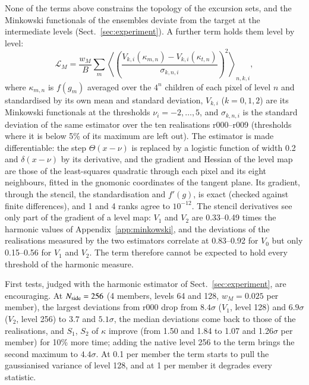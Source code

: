 \documentclass{aa}
\newcommand{\nside}{N_{\rm side}}
\begin{document}
None of the terms above constrains the topology of the excursion sets, and the Minkowski functionals of the ensembles deviate from the target at the intermediate levels (Sect.~\ref{sec:experiment}). A further term holds them level by level:
\begin{equation}
\mathcal{L}_M = \frac{w_M}{B}\sum_m \left\langle \left(\frac{V_{k,i}(\kappa_{m,n}) - V_{k,i}(\kappa_{t,n})}{\sigma_{k,n,i}}\right)^2\right\rangle_{n,k,i},
\end{equation}
where $\kappa_{m,n}$ is $f(g_m)$ averaged over the $4^{n}$ children of each pixel of level $n$ and standardised by its own mean and standard deviation, $V_{k,i}$ ($k=0,1,2$) are its Minkowski functionals at the thresholds $\nu_i=-2,\dots,5$, and $\sigma_{k,n,i}$ is the standard deviation of the same estimator over the ten realisations r000--r009 (thresholds where it is below 5\% of its maximum are left out). The estimator is made differentiable: the step $\Theta(x-\nu)$ is replaced by a logistic function of width 0.2 and $\delta(x-\nu)$ by its derivative, and the gradient and Hessian of the level map are those of the least-squares quadratic through each pixel and its eight neighbours, fitted in the gnomonic coordinates of the tangent plane. Its gradient, through the stencil, the standardisation and $f'(g)$, is exact (checked against finite differences), and 1 and 4 ranks agree to $10^{-12}$. The stencil derivatives see only part of the gradient of a level map: $V_1$ and $V_2$ are 0.33--0.49 times the harmonic values of Appendix~\ref{app:minkowski}, and the deviations of the realisations measured by the two estimators correlate at 0.83--0.92 for $V_0$ but only 0.15--0.56 for $V_1$ and $V_2$. The term therefore cannot be expected to hold every threshold of the harmonic measure.

First tests, judged with the harmonic estimator of Sect.~\ref{sec:experiment}, are encouraging. At $\nside=256$ (4 members, levels 64 and 128, $w_M=0.025$ per member), the largest deviations from r000 drop from $8.4\sigma$ ($V_1$, level 128) and $6.9\sigma$ ($V_2$, level 256) to $3.7$ and $5.1\sigma$, the median deviations come back to those of the realisations, and $S_1$, $S_2$ of $\kappa$ improve (from 1.50 and 1.84 to 1.07 and 1.26$\sigma$ per member) for 10\% more time; adding the native level 256 to the term brings the second maximum to $4.4\sigma$. At 0.1 per member the term starts to pull the gaussianised variance of level 128, and at 1 per member it degrades every statistic.
\end{document}
